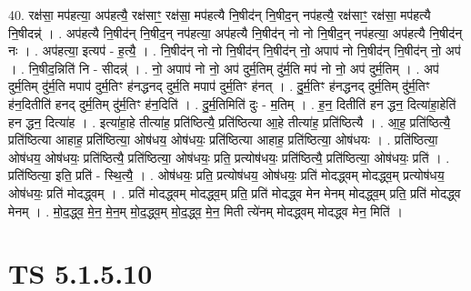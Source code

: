 \documentclass[17pt]{extarticle}
\begin{document}
40. रक्ष॑सा॒ मप॑हत्या॒ अप॑हत्यै॒ रक्ष॑साꣳ॒॒ रक्ष॑सा॒ मप॑हत्यै नि॒षीद॑न् नि॒षीद॒न् नप॑हत्यै॒ रक्ष॑साꣳ॒॒ रक्ष॑सा॒ मप॑हत्यै नि॒षीदन्न्॑ । . अप॑हत्यै नि॒षीद॑न् नि॒षीद॒न् नप॑हत्या॒ अप॑हत्यै नि॒षीद॑न् नो नो नि॒षीद॒न् नप॑हत्या॒ अप॑हत्यै नि॒षीद॑न् नः । . अप॑हत्या॒ इत्यप॑ - ह॒त्यै॒ । . नि॒षीद॑न् नो नो नि॒षीद॑न् नि॒षीद॑न् नो॒ अपाप॑ नो नि॒षीद॑न् नि॒षीद॑न् नो॒ अप॑ । . नि॒षीद॒न्निति॑ नि - सीदन्न्॑ । . नो॒ अपाप॑ नो नो॒ अप॑ दुर्म॒तिम् दु॑र्म॒ति मप॑ नो नो॒ अप॑ दुर्म॒तिम् । . अप॑ दुर्म॒तिम् दु॑र्म॒ति मपाप॑ दुर्म॒तिꣳ ह॑नद्धनद् दुर्म॒ति मपाप॑ दुर्म॒तिꣳ ह॑नत् । . दु॒र्म॒तिꣳ ह॑नद्धनद् दुर्म॒तिम् दु॑र्म॒तिꣳ ह॑न॒दितीति॑ हनद् दुर्म॒तिम् दु॑र्म॒तिꣳ ह॑न॒दिति॑ । . दु॒र्म॒तिमिति॑ दुः - म॒तिम् । . ह॒न॒ दितीति॑ हन द्धन॒ दित्या॑हा॒हेति॑ हन द्धन॒ दित्या॑ह । . इत्या॑हा॒हे तीत्या॑ह॒ प्रति॑ष्ठित्यै॒ प्रति॑ष्ठित्या आ॒हे तीत्या॑ह॒ प्रति॑ष्ठित्यै । . आ॒ह॒ प्रति॑ष्ठित्यै॒ प्रति॑ष्ठित्या आहाह॒ प्रति॑ष्ठित्या॒ ओष॑धय॒ ओष॑धयः॒ प्रति॑ष्ठित्या आहाह॒ प्रति॑ष्ठित्या॒ ओष॑धयः । . प्रति॑ष्ठित्या॒ ओष॑धय॒ ओष॑धयः॒ प्रति॑ष्ठित्यै॒ प्रति॑ष्ठित्या॒ ओष॑धयः॒ प्रति॒ प्रत्योष॑धयः॒ प्रति॑ष्ठित्यै॒ प्रति॑ष्ठित्या॒ ओष॑धयः॒ प्रति॑ । . प्रति॑ष्ठित्या॒ इति॒ प्रति॑ - स्थि॒त्यै॒ । . ओष॑धयः॒ प्रति॒ प्रत्योष॑धय॒ ओष॑धयः॒ प्रति॑ मोदद्ध्वम् मोदद्ध्व॒म् प्रत्योष॑धय॒ ओष॑धयः॒ प्रति॑ मोदद्ध्वम् । . प्रति॑ मोदद्ध्वम् मोदद्ध्व॒म् प्रति॒ प्रति॑ मोदद्ध्व मेन मेनम् मोदद्ध्व॒म् प्रति॒ प्रति॑ मोदद्ध्व मेनम् । . मो॒द॒द्ध्व॒ मे॒न॒ मे॒न॒म् मो॒द॒द्ध्व॒म् मो॒द॒द्ध्व॒ मे॒न॒ मिती त्ये॑नम् मोदद्ध्वम् मोदद्ध्व मेन॒ मिति॑ । \newline
\pagebreak
{}

\section{ TS 5.1.5.10 }
\end{document}
